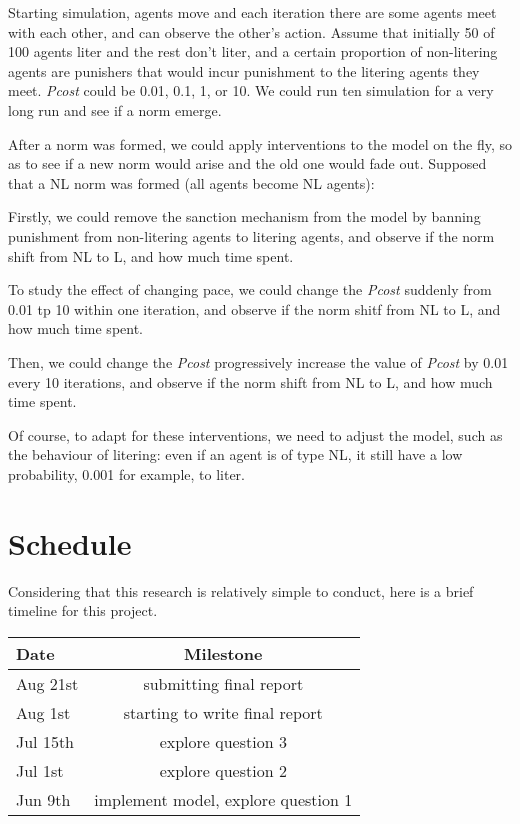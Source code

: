 \documentclass[12pt]{extarticle}
\begin{document}
Starting simulation, agents move and each iteration there are some agents meet with each other, and can observe the other's action. Assume that initially 50 of 100 agents liter and the rest don't liter, and a certain proportion of non-litering agents are punishers that would incur punishment to the litering agents they meet. \textit{Pcost} could be 0.01, 0.1, 1, or 10. We could run ten simulation for a very long run and see if a norm emerge.

After a norm was formed, we could apply interventions to the model on the fly, so as to see if a new norm would arise and the old one would fade out. Supposed that a NL norm was formed (all agents become NL agents):

Firstly, we could remove the sanction mechanism from the model by banning punishment from non-litering agents to litering agents, and observe if the norm shift from NL to L, and how much time spent.

To study the effect of changing pace, we could change the \textit{Pcost} suddenly from 0.01 tp 10 within one iteration, and observe if the norm shitf from NL to L, and how much time spent.

Then, we could change the \textit{Pcost} progressively increase the value of \textit{Pcost} by 0.01 every 10 iterations, and observe if the norm shift from NL to L, and how much time spent.

Of course, to adapt for these interventions, we need to adjust the model, such as the behaviour of litering: even if an agent is of type NL, it still have a low probability, 0.001 for example, to liter.

\section{Schedule}
Considering that this research is relatively simple to conduct, here is a brief timeline for this project. 

\begin{tabular}{l|c}
\hline
Date      &  Milestone \\\hline
Aug 21st  & submitting final report  \\
Aug 1st   & starting to write final report  \\
Jul 15th  & explore question 3  \\
Jul 1st   & explore question 2  \\
Jun 9th   & implement model, explore question 1 \\
\hline
\end{tabular}



\end{document}
